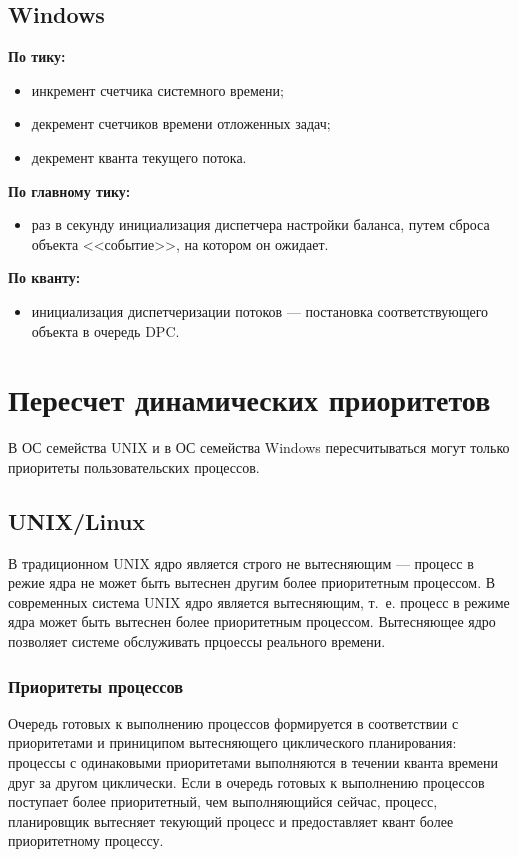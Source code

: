 \section{Windows}

\textbf{По тику:}
\begin{itemize}
    \item инкремент счетчика системного времени;
    \item декремент счетчиков времени отложенных задач;
    \item декремент кванта текущего потока.
\end{itemize}

\textbf{По главному тику:}
\begin{itemize}
    \item раз в секунду инициализация диспетчера настройки баланса, путем сброса объекта <<событие>>, на котором он ожидает.
\end{itemize}

\textbf{По кванту:}
\begin{itemize}
    \item инициализация диспетчеризации потоков --- постановка соответствующего объекта в очередь DPC.
\end{itemize}

\chapter{Пересчет динамических приоритетов}

В ОС семейства UNIX и в ОС семейства Windows пересчитываться могут только приоритеты пользовательских процессов.

\section{UNIX/Linux}

В традиционном UNIX ядро является строго не вытесняющим --- процесс в режие ядра не может быть вытеснен другим более приоритетным процессом. В современных система UNIX ядро является вытесняющим, т.~е. процесс в режиме ядра может быть вытеснен более приоритетным процессом. Вытесняющее ядро позволяет системе обслуживать прцоессы реального времени.

\subsection{Приоритеты процессов}

Очередь готовых к выполнению процессов формируется в соответствии с приоритетами и приниципом вытесняющего циклического планирования: процессы с одинаковыми приоритетами выполняются в течении кванта времени друг за другом циклически. Если в очередь готовых к выполнению процессов поступает более приоритетный, чем выполняющийся сейчас, процесс, планировщик вытесняет текующий процесс и предоставляет квант более приоритетному процессу.

